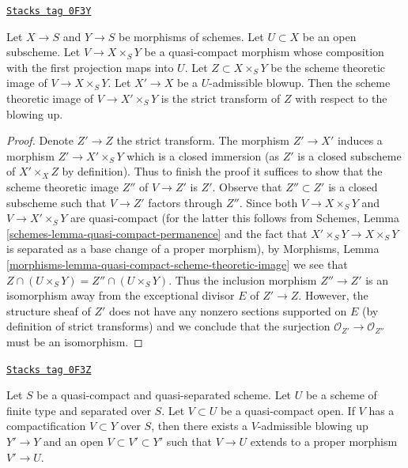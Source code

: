 \begin{lemma}
\label{flat-lemma-replaced-by-strict-transform}
\href{https://stacks.math.columbia.edu/tag/0F3Y}{\texttt{Stacks tag 0F3Y}}

Let $X \to S$ and $Y \to S$ be morphisms of schemes.
Let $U \subset X$ be an open subscheme.
Let $V \to X \times_S Y$ be a quasi-compact morphism
whose composition with the first projection maps into $U$.
Let $Z \subset X \times_S Y$ be the scheme theoretic image of
$V \to X \times_S Y$. Let $X' \to X$ be a $U$-admissible blowup.
Then the scheme theoretic image of $V \to X' \times_S Y$ is the
strict transform of $Z$ with respect to the blowing up.
\end{lemma}

\begin{proof}
Denote $Z' \to Z$ the strict transform. The morphism $Z' \to X'$
induces a morphism $Z' \to X' \times_S Y$ which is a closed immersion
(as $Z'$ is a closed subscheme of $X' \times_X Z$ by definition).
Thus to finish the proof it suffices to show that the scheme theoretic
image $Z''$ of $V \to Z'$ is $Z'$. Observe that $Z'' \subset Z'$
is a closed subscheme such that $V \to Z'$ factors through $Z''$.
Since both $V \to X \times_S Y$ and $V \to X' \times_S Y$ are
quasi-compact (for the latter this follows from Schemes, Lemma
\ref{schemes-lemma-quasi-compact-permanence}
and the fact that $X' \times_S Y \to X \times_S Y$ is separated
as a base change of a proper morphism), by Morphisms, Lemma
\ref{morphisms-lemma-quasi-compact-scheme-theoretic-image}
we see that $Z \cap (U \times_S Y) = Z'' \cap (U \times_S Y)$.
Thus the inclusion morphism $Z'' \to Z'$ is an isomorphism
away from the exceptional divisor $E$ of $Z' \to Z$. However, the
structure sheaf of $Z'$ does not have any nonzero sections supported
on $E$ (by definition of strict transforms) and we conclude that
the surjection $\mathcal{O}_{Z'} \to \mathcal{O}_{Z''}$
must be an isomorphism.
\end{proof}

\begin{lemma}
\label{flat-lemma-compactification-dominates}
\href{https://stacks.math.columbia.edu/tag/0F3Z}{\texttt{Stacks tag 0F3Z}}

Let $S$ be a quasi-compact and quasi-separated scheme. Let $U$ be a
scheme of finite type and separated over $S$. Let $V \subset U$ be a
quasi-compact open. If $V$ has a compactification $V \subset Y$
over $S$, then there exists a $V$-admissible blowing up $Y' \to Y$ and an
open $V \subset V' \subset Y'$ such that $V \to U$
extends to a proper morphism $V' \to U$.
\end{lemma}

